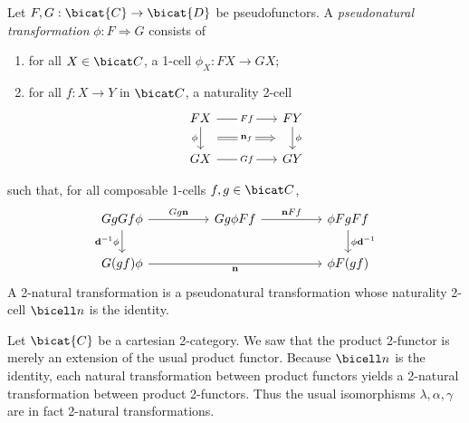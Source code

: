 \begin{definition}
  Let $F,G:\bicat{C}\to\bicat{D}$ be pseudofunctors. A \emph{pseudonatural transformation}
  $\phi:F\Rightarrow G$ consists of
  \begin{enumerate}
    \item for all $X\in\bicat C$, a 1-cell $\phi_X : FX\to GX$;
    \item for all $f:X\to Y$ in $\bicat C$, a naturality 2-cell
      \begin{equation}\label{eq:naturality_2cell}
        \begin{tikzcd}
          FX && FY \\
          GX && GY
          \arrow["Ff"{description}, from=1-1, to=1-3]
          \arrow[""{name=0, anchor=center, inner sep=0}, "\phi"', from=1-1, to=2-1]
          \arrow["Gf"{description}, from=2-1, to=2-3]
          \arrow[""{name=1, anchor=center, inner sep=0}, "\phi", from=1-3, to=2-3]
          \arrow["{\mathbf n_f}"{description}, shorten <=13pt, shorten >=13pt, Rightarrow, from=0, to=1]
        \end{tikzcd}
      \end{equation}
  \end{enumerate}
  such that, for all composable 1-cells $f,g\in\bicat C$,
  \begin{equation}
    \begin{tikzcd}
      GgGf\phi && {Gg\phi Ff} && {\phi Fg Ff} \\
      {G(gf)\phi} &&&& {\phi F(gf)}
      \arrow["{\mathbf d^{-1}\phi}"', from=1-1, to=2-1]
      \arrow["{Gg\mathbf n}", from=1-1, to=1-3]
      \arrow["{\mathbf n Ff}", from=1-3, to=1-5]
      \arrow["{\phi\mathbf d^{-1}}", from=1-5, to=2-5]
      \arrow["{\mathbf n}"', from=2-1, to=2-5]
    \end{tikzcd}
  \end{equation}
  A 2-natural transformation is a pseudonatural transformation whose naturality 2-cell
  $\bicell n$ is the identity.
\end{definition}

\begin{example}\label{ex:cartesian_monoidal_structure}
  Let $\bicat{C}$ be a cartesian 2-category. We saw that the product 2-functor is merely
  an extension of the usual product functor. Because $\bicell n$ is the identity,
  each natural transformation between product functors yields a 2-natural transformation
  between product 2-functors. Thus the usual isomorphisms $\lambda,\alpha,\gamma$ are
  in fact 2-natural transformations.
\end{example}

